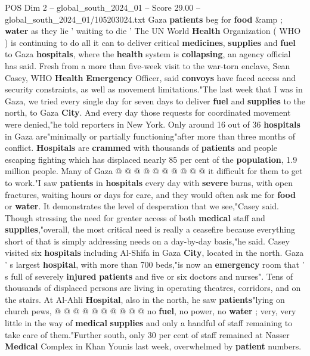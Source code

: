 \begin{textsample}{POS Dim 2 – global\_south\_2024\_01 – Score 29.00 – global\_south\_2024\_01/105203024.txt}  \label{ex:f2_pos_127}
Gaza \textbf{patients} beg for \textbf{food} \&amp ; \textbf{water} as they lie ' waiting to die ' The UN World \textbf{Health} Organization ( WHO ) is continuing to do all it can to deliver critical \textbf{medicines}, \textbf{supplies} and \textbf{fuel} to Gaza \textbf{hospitals}, where the \textbf{health} system is \textbf{collapsing}, an agency official has said.
Fresh from a more than five-week visit to the war-torn enclave, Sean Casey, WHO \textbf{Health} \textbf{Emergency} Officer, said \textbf{convoys} have faced access and security constraints, as well as movement limitations."The last week that I was in Gaza, we tried every single day for seven days to deliver \textbf{fuel} and \textbf{supplies} to the north, to Gaza \textbf{City}.
And every day those requests for coordinated movement were denied,"he told reporters in New York.
Only around 16 out of 36 \textbf{hospitals} in Gaza are"minimally or partially functioning"after more than three months of conflict. \textbf{Hospitals} are \textbf{crammed} with thousands of \textbf{patients} and people escaping fighting which has displaced nearly 85 per cent of the \textbf{population}, 1.9 million people.
Many of Gaza @ @ @ @ @ @ @ @ @ @ it difficult for them to get to work."I saw \textbf{patients} in \textbf{hospitals} every day with \textbf{severe} burns, with open fractures, waiting hours or days for care, and they would often ask me for \textbf{food} or \textbf{water}.
It demonstrates the level of desperation that we see,"Casey said.
Though stressing the need for greater access of both \textbf{medical} staff and \textbf{supplies},"overall, the most critical need is really a ceasefire because everything short of that is simply addressing needs on a day-by-day basis,"he said.
Casey visited six \textbf{hospitals} including Al-Shifa in Gaza \textbf{City}, located in the north.
Gaza ' s largest \textbf{hospital}, with more than 700 beds,"is now an \textbf{emergency} room that ' s full of severely \textbf{injured} \textbf{patients} and five or six doctors and nurses".
Tens of thousands of displaced persons are living in operating theatres, corridors, and on the stairs.
At Al-Ahli \textbf{Hospital}, also in the north, he saw \textbf{patients}"lying on church pews, @ @ @ @ @ @ @ @ @ @ no \textbf{fuel}, no power, no \textbf{water} ; very, very little in the way of \textbf{medical} \textbf{supplies} and only a handful of staff remaining to take care of them."Further south, only 30 per cent of staff remained at Nasser \textbf{Medical} Complex in Khan Younis last week, overwhelmed by \textbf{patient} numbers.

\end{textsample}
